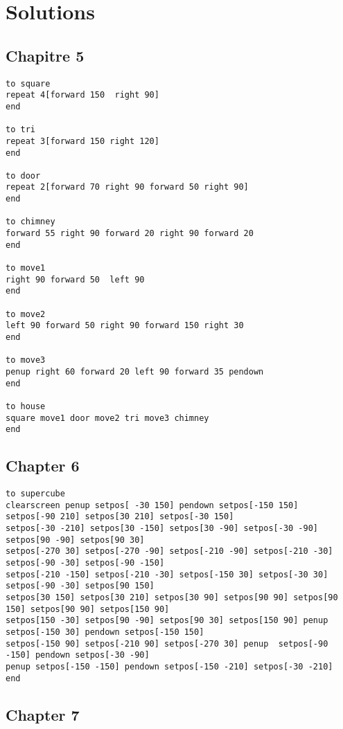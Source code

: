 \chapter{Solutions}
\section{Chapitre 5}
\begin{verbatim}
to square
repeat 4[forward 150  right 90]
end

to tri
repeat 3[forward 150 right 120]
end

to door
repeat 2[forward 70 right 90 forward 50 right 90]
end

to chimney
forward 55 right 90 forward 20 right 90 forward 20
end

to move1
right 90 forward 50  left 90
end

to move2
left 90 forward 50 right 90 forward 150 right 30
end

to move3
penup right 60 forward 20 left 90 forward 35 pendown
end

to house
square move1 door move2 tri move3 chimney
end

\end{verbatim}

\section{Chapter 6}
\begin{verbatim}
to supercube
clearscreen penup setpos[ -30 150] pendown setpos[-150 150]  setpos[-90 210] setpos[30 210] setpos[-30 150]
setpos[-30 -210] setpos[30 -150] setpos[30 -90] setpos[-30 -90] setpos[90 -90] setpos[90 30]  
setpos[-270 30] setpos[-270 -90] setpos[-210 -90] setpos[-210 -30] setpos[-90 -30] setpos[-90 -150]
setpos[-210 -150] setpos[-210 -30] setpos[-150 30] setpos[-30 30] setpos[-90 -30] setpos[90 150]
setpos[30 150] setpos[30 210] setpos[30 90] setpos[90 90] setpos[90 150] setpos[90 90] setpos[150 90]
setpos[150 -30] setpos[90 -90] setpos[90 30] setpos[150 90] penup setpos[-150 30] pendown setpos[-150 150] 
setpos[-150 90] setpos[-210 90] setpos[-270 30] penup  setpos[-90 -150] pendown setpos[-30 -90]
penup setpos[-150 -150] pendown setpos[-150 -210] setpos[-30 -210]
end
\end{verbatim}

\section{Chapter 7}
